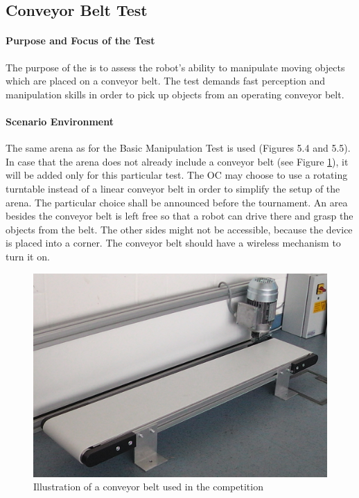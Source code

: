 \newpage
\subsection{Conveyor Belt Test}


\paragraph{Purpose and Focus of the Test}
The purpose of the  is to assess the robot’s ability to manipulate moving objects which are placed on a conveyor belt. The test demands fast perception and manipulation skills in order to pick up objects from an operating conveyor belt.

\paragraph{Scenario Environment}
The same arena as for the Basic Manipulation Test is used (Figures 5.4 and 5.5). In case that the arena does not already include a conveyor belt (see Figure \ref{fig:conveyor_belt}), it will be added only for this particular test.
The OC may choose to use a rotating turntable instead of a linear conveyor belt in order to simplify the setup of the arena. The particular choice shall be announced before the tournament.
An area besides the conveyor belt is left free so that a robot can drive there and grasp the objects from the belt. The other sides might not be accessible, because the device is placed into a corner. 
The conveyor belt should have a wireless mechanism to turn it on. 

\begin{figure}
\includegraphics[width= \textwidth ]{../images/conveyor_belt.jpg}
\caption{Illustration of a conveyor belt used in the competition}
\label{fig:conveyor_belt}
\end{figure}


